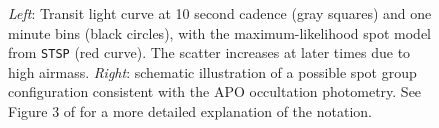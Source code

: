 \begin{figure}
\begin{center}
\begin{minipage}{6in}
  \centering
  \hspace*{.2 in}
\end{minipage}
\caption{\textsl{Left}: Transit light curve at 10 second cadence (gray squares) and one minute bins (black circles), with the maximum-likelihood spot model from \texttt{STSP} (red curve). The scatter increases at later times due to high airmass. \textsl{Right}: schematic illustration of a possible spot group configuration consistent with the APO occultation photometry. See Figure 3 of \citet{Morris2017a} for a more detailed explanation of the notation.
\label{fig}}
\end{center}
\end{figure}

